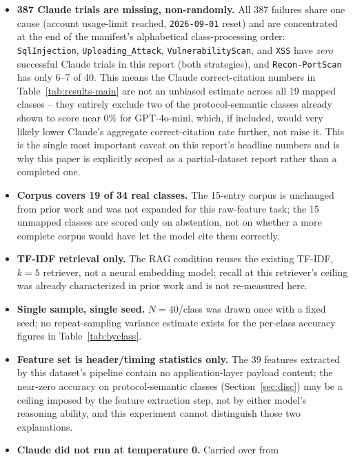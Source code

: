 \documentclass[11pt]{article}
\begin{document}
\begin{itemize}
    \item \textbf{387 Claude trials are missing, non-randomly.} All 387
    failures share one cause (account usage-limit reached,
    \texttt{2026-09-01} reset) and are concentrated at the end of the
    manifest's alphabetical class-processing order: \texttt{SqlInjection},
    \texttt{Uploading\_Attack}, \texttt{VulnerabilityScan}, and
    \texttt{XSS} have \emph{zero} successful Claude trials in this report
    (both strategies), and \texttt{Recon-PortScan} has only 6--7 of 40. This
    means the Claude correct-citation numbers in Table~\ref{tab:results-main}
    are not an unbiased estimate across all 19 mapped classes -- they
    entirely exclude two of the protocol-semantic classes already shown to
    score near 0\% for GPT-4o-mini, which, if included, would very likely
    lower Claude's aggregate correct-citation rate further, not raise it.
    This is the single most important caveat on this report's headline
    numbers and is why this paper is explicitly scoped as a partial-dataset
    report rather than a completed one.
    \item \textbf{Corpus covers 19 of 34 real classes.} The 15-entry corpus
    is unchanged from prior work and was not expanded for this raw-feature
    task; the 15 unmapped classes are scored only on abstention, not on
    whether a more complete corpus would have let the model cite them
    correctly.
    \item \textbf{TF-IDF retrieval only.} The RAG condition reuses the
    existing TF-IDF, $k{=}5$ retriever, not a neural embedding model; recall
    at this retriever's ceiling was already characterized in prior work and
    is not re-measured here.
    \item \textbf{Single sample, single seed.} $N{=}40$/class was drawn
    once with a fixed seed; no repeat-sampling variance estimate exists for
    the per-class accuracy figures in Table~\ref{tab:byclass}.
    \item \textbf{Feature set is header/timing statistics only.} The 39
    features extracted by this dataset's pipeline contain no
    application-layer payload content; the near-zero accuracy on
    protocol-semantic classes (Section~\ref{sec:disc}) may be a ceiling
    imposed by the feature extraction step, not by either model's
    reasoning ability, and this experiment cannot distinguish those two
    explanations.
    \item \textbf{Claude did not run at temperature 0.} Carried over from

\end{itemize}
\end{document}
